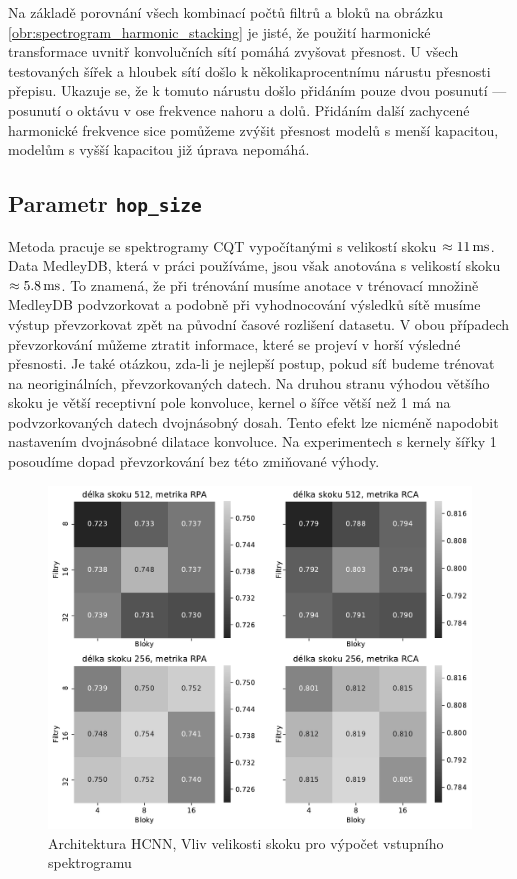 Na základě porovnání všech kombinací počtů filtrů a bloků na obrázku \ref{obr:spectrogram_harmonic_stacking} je jisté, že použití harmonické transformace uvnitř konvolučních sítí pomáhá zvyšovat přesnost. U všech testovaných šířek a hloubek sítí došlo k několikaprocentnímu nárustu přesnosti přepisu. Ukazuje se, že k tomuto nárustu došlo přidáním pouze dvou posunutí --- posunutí o oktávu v ose frekvence nahoru a dolů. Přidáním další zachycené harmonické frekvence sice pomůžeme zvýšit přesnost modelů s menší kapacitou, modelům s vyšší kapacitou již úprava nepomáhá. 

\subsection{Parametr \texttt{hop\_size}}

Metoda \cite{Bittner2017} pracuje se spektrogramy CQT vypočítanými s velikostí skoku $\approx 11\,\rm ms$. Data MedleyDB, která v práci používáme, jsou však anotována s velikostí skoku $\approx 5.8\,\rm ms$. To znamená, že při trénování musíme anotace v trénovací množině MedleyDB podvzorkovat a podobně při vyhodnocování výsledků sítě musíme výstup převzorkovat zpět na původní časové rozlišení datasetu. V obou případech převzorkování můžeme ztratit informace, které se projeví v horší výsledné přesnosti. Je také otázkou, zda-li je nejlepší postup, pokud síť budeme trénovat na neoriginálních, převzorkovaných datech. Na druhou stranu výhodou většího skoku je větší receptivní pole konvoluce, kernel o šířce větší než 1 má na podvzorkovaných datech dvojnásobný dosah. Tento efekt lze nicméně napodobit nastavením dvojnásobné dilatace konvoluce. Na experimentech s kernely šířky 1 posoudíme dopad převzorkování bez této zmiňované výhody.

\begin{figure}[h]\centering
    \includegraphics[scale=0.55]{../img/figures/spectrogram_512_vs_256_grey}
\caption{Architektura HCNN, Vliv velikosti skoku pro výpočet vstupního spektrogramu}\label{obr:spectrogram_512_vs_256}
\end{figure}

